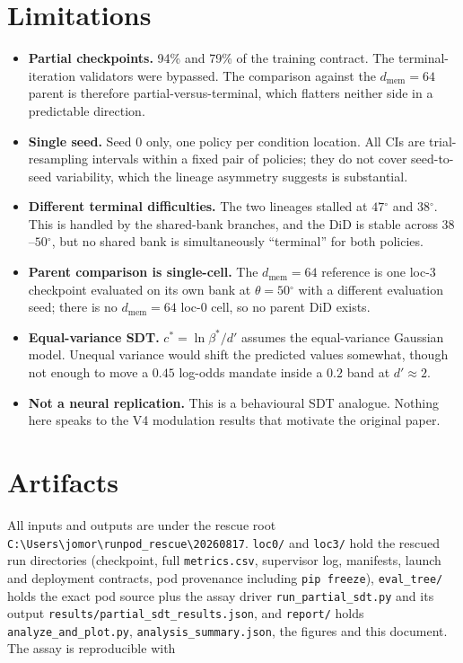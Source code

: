 \documentclass[11pt]{article}
\newcommand{\dprime}{d'}
\newcommand{\dg}{\ensuremath{^\circ}}
\begin{document}
\section{Limitations}

\begin{itemize}[leftmargin=1.4em,itemsep=2pt]
\item \textbf{Partial checkpoints.} 94\% and 79\% of the training contract. The
terminal-iteration validators were bypassed. The comparison against the
$d_{\mathrm{mem}}{=}64$ parent is therefore partial-versus-terminal, which flatters
neither side in a predictable direction.
\item \textbf{Single seed.} Seed 0 only, one policy per condition location. All CIs are
trial-resampling intervals within a fixed pair of policies; they do not cover
seed-to-seed variability, which the lineage asymmetry suggests is substantial.
\item \textbf{Different terminal difficulties.} The two lineages stalled at $47\dg$ and
$38\dg$. This is handled by the shared-bank branches, and the DiD is stable across
$38$--$50\dg$, but no shared bank is simultaneously ``terminal'' for both policies.
\item \textbf{Parent comparison is single-cell.} The $d_{\mathrm{mem}}{=}64$ reference is
one loc-3 checkpoint evaluated on its own bank at $\theta = 50\dg$ with a different
evaluation seed; there is no $d_{\mathrm{mem}}{=}64$ loc-0 cell, so no parent DiD exists.
\item \textbf{Equal-variance SDT.} $c^{\ast} = \ln\beta^{\ast}/\dprime$ assumes the
equal-variance Gaussian model. Unequal variance would shift the predicted values
somewhat, though not enough to move a $0.45$ log-odds mandate inside a $0.2$ band at
$\dprime \approx 2$.
\item \textbf{Not a neural replication.} This is a behavioural SDT analogue. Nothing here
speaks to the V4 modulation results that motivate the original paper.
\end{itemize}

\section{Artifacts}

All inputs and outputs are under the rescue root\\
\texttt{C:\textbackslash Users\textbackslash jomor\textbackslash runpod\_rescue\textbackslash 20260817}.
\texttt{loc0/} and \texttt{loc3/} hold the rescued run directories (checkpoint, full
\texttt{metrics.csv}, supervisor log, manifests, launch and deployment contracts, pod
provenance including \texttt{pip freeze}), \texttt{eval\_tree/} holds the exact pod source
plus the assay driver \texttt{run\_partial\_sdt.py} and its output
\texttt{results/partial\_sdt\_results.json}, and \texttt{report/} holds
\texttt{analyze\_and\_plot.py}, \texttt{analysis\_summary.json}, the figures and this
document. The assay is reproducible with
\end{document}
